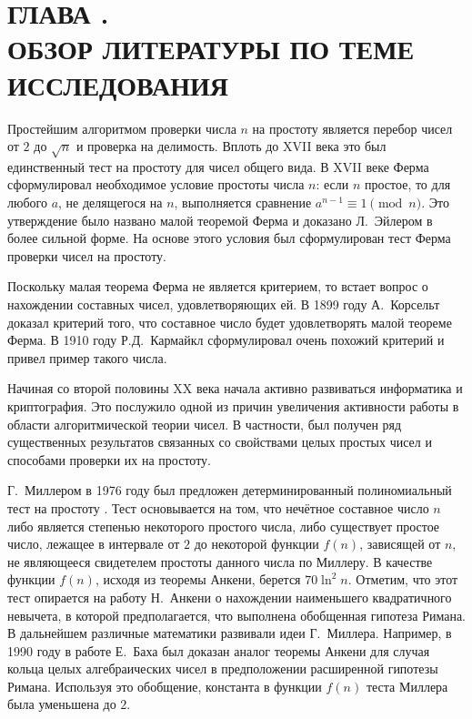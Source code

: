 \documentclass[_00_dissertation.tex]{subfiles}
\begin{document}
\onlyinsubfile{
    \renewcommand{\contentsname}{ОГЛАВЛЕНИЕ}
    \setcounter{tocdepth}{3}
    \tableofcontents
}

\chapter*{ГЛАВА .\\ ОБЗОР ЛИТЕРАТУРЫ ПО ТЕМЕ ИССЛЕДОВАНИЯ}\label{chapter:Literature_review}


Простейшим алгоритмом проверки числа $n$ на простоту является перебор чисел от $2$ до $\sqrt{n}$ и проверка на делимость.
Вплоть до XVII века это был единственный тест на простоту для чисел общего вида.
В XVII веке Ферма сформулировал необходимое условие простоты числа $n$: если $n$ простое, то для любого $a$, не делящегося на $n$, выполняется сравнение $a^{n-1} \equiv 1{\pmod{n}}$.
Это утверждение было названо малой теоремой Ферма и доказано Л.~Эйлером в более сильной форме.
На основе этого условия был сформулирован тест Ферма проверки чисел на простоту.

Поскольку малая теорема Ферма не является критерием, то встает вопрос о нахождении составных чисел, удовлетворяющих ей.
В 1899 году А.~Корсельт доказал критерий того, что составное число будет удовлетворять малой теореме Ферма.
В 1910 году Р.Д.~Кармайкл сформулировал очень похожий критерий и привел пример такого числа.

Начиная со второй половины XX века начала активно развиваться информатика и криптография.
Это послужило одной из причин увеличения активности работы в области алгоритмической теории чисел.
В частности, был получен ряд существенных результатов связанных со свойствами целых простых чисел и способами проверки их на простоту.

Г.~Миллером в 1976 году был предложен детерминированный полиномиальный тест на простоту \cite{source:Miller}.
Тест основывается на том, что нечётное составное число $n$ либо является степенью некоторого простого числа, либо существует простое число, лежащее в интервале от $2$ до некоторой функции $f(n)$, зависящей от $n$, не являющееся свидетелем простоты данного числа по Миллеру.
В качестве функции $f(n)$, исходя из теоремы Анкени, берется $70 \ln^2 n$.
Отметим, что этот тест опирается на работу Н.~Анкени о нахождении наименьшего квадратичного невычета, в которой предполагается, что выполнена обобщенная гипотеза Римана.
В дальнейшем различные математики развивали идеи Г.~Миллера.
Например, в 1990 году в работе Е.~Баха \cite{source:Bach} был доказан аналог теоремы Анкени для случая кольца целых алгебраических чисел в предположении расширенной гипотезы Римана.
Используя это обобщение, константа в функции $f(n)$ теста Миллера была уменьшена до $2$.
\end{document}
